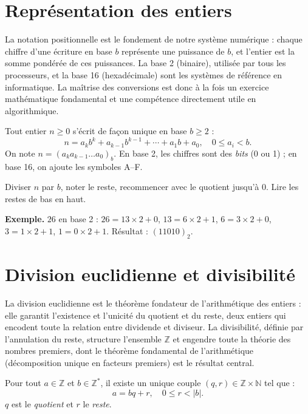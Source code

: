\documentclass[11pt,a4paper,twoside]{book}
\newcommand{\N}{\mathbb{N}}
\newcommand{\Z}{\mathbb{Z}}
\begin{document}
\section{Représentation des entiers}

La notation positionnelle est le fondement de notre système numérique : chaque chiffre d'une écriture en base $b$ représente une puissance de $b$, et l'entier est la somme pondérée de ces puissances. La base 2 (binaire), utilisée par tous les processeurs, et la base 16 (hexadécimale) sont les systèmes de référence en informatique. La maîtrise des conversions est donc à la fois un exercice mathématique fondamental et une compétence directement utile en algorithmique.

\begin{definitionbox}
Tout entier $n \geq 0$ s'écrit de façon unique en base $b \geq 2$ :
\[
  n = a_k b^k + a_{k-1}b^{k-1} + \cdots + a_1 b + a_0, \quad 0 \leq a_i < b.
\]
On note $n = (a_k a_{k-1}\ldots a_0)_b$.
En base 2, les chiffres sont des \emph{bits} (0 ou 1) ; en base 16, on ajoute les symboles A–F.
\end{definitionbox}

\begin{methodebox}
Diviser $n$ par $b$, noter le reste, recommencer avec le quotient jusqu'à 0.
Lire les restes de bas en haut.

\textbf{Exemple.} $26$ en base 2 :
$26 = 13\times2+0$, $13=6\times2+1$, $6=3\times2+0$, $3=1\times2+1$, $1=0\times2+1$.
Résultat : $(11010)_2$.
\end{methodebox}

\section{Division euclidienne et divisibilité}

La division euclidienne est le théorème fondateur de l'arithmétique des entiers : elle garantit l'existence et l'unicité du quotient et du reste, deux entiers qui encodent toute la relation entre dividende et diviseur. La divisibilité, définie par l'annulation du reste, structure l'ensemble $\mathbb{Z}$ et engendre toute la théorie des nombres premiers, dont le théorème fondamental de l'arithmétique (décomposition unique en facteurs premiers) est le résultat central.

\begin{theoremebox}
Pour tout $a \in \Z$ et $b \in \Z^*$, il existe un unique couple $(q,r) \in \Z\times\N$ tel que :
\[
  a = bq + r, \quad 0 \leq r < |b|.
\]
$q$ est le \emph{quotient} et $r$ le \emph{reste}.
\end{theoremebox}
\end{document}

